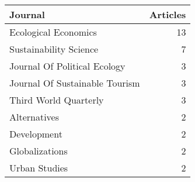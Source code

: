 \begin{tabular}{lr}
  \toprule
{\textbf{Journal}} & {\textbf{Articles}} \\ 
  \midrule
Ecological Economics &  13 \\ 
  Sustainability Science &   7 \\ 
  Journal Of Political Ecology &   3 \\ 
  Journal Of Sustainable Tourism &   3 \\ 
  Third World Quarterly &   3 \\ 
  Alternatives &   2 \\ 
  Development &   2 \\ 
  Globalizations &   2 \\ 
  Urban Studies &   2 \\ 
   \bottomrule
\end{tabular}
